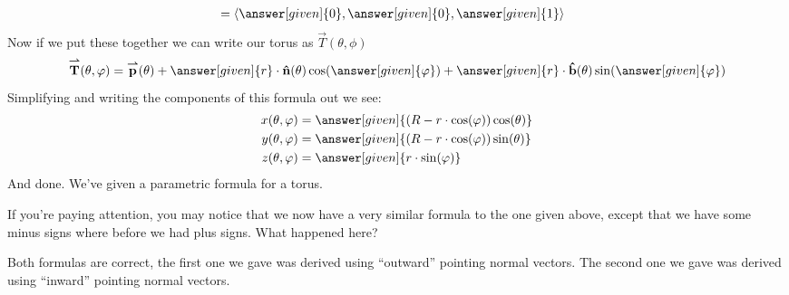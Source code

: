 \documentclass{ximera}
\begin{document}
\begin{example}
\begin{explanation}
\begin{align*}
      &=\vector{\answer[given]{0},\answer[given]{0},\answer[given]{1}}
    \end{align*}
    Now if we put these together we can write our torus as $\vec{T}(\theta,\phi)$
    \[
    \vec{T}(\theta,\phi) = \vec{p}(\theta) + \answer[given]{r}\cdot \unormal(\theta)\cos(\answer[given]{\phi}) + \answer[given]{r}\cdot \ubinormal(\theta)\sin(\answer[given]{\phi})
    \]
    Simplifying and writing the components of this formula out we see:
    \begin{align*}
      x(\theta,\phi) &= \answer[given]{(R - r\cdot \cos(\phi))\cos(\theta)}\\
      y(\theta,\phi) &= \answer[given]{(R - r\cdot \cos(\phi))\sin(\theta)}\\
      z(\theta,\phi) &= \answer[given]{r\cdot \sin(\phi)}
    \end{align*}
    And done. We've given a parametric formula for a torus.
  \end{explanation}
\end{example}

\begin{question}
  If you're paying attention, you may notice that we now have a very
  similar formula to the one given above, except that we have some
  minus signs where before we had plus signs. What happened here?
  \begin{prompt}
    \begin{multipleChoice}
    \end{multipleChoice}
    \begin{feedback}[correct]
      Both formulas are correct, the first one we gave was derived
      using ``outward'' pointing normal vectors. The second one we
      gave was derived using ``inward'' pointing normal vectors.
    \end{feedback}
  \end{prompt}
\end{question}
\end{document}
